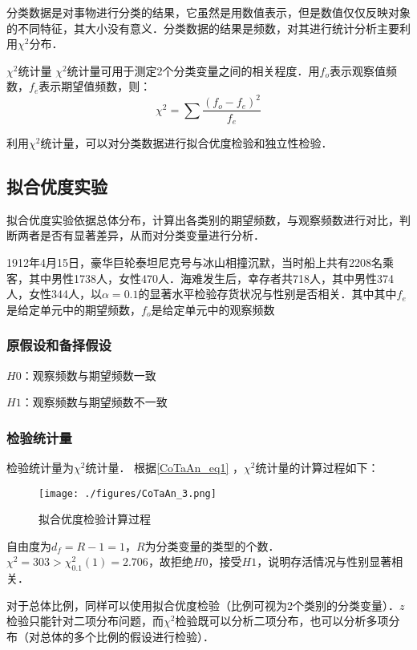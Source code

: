 分类数据是对事物进行分类的结果，它虽然是用数值表示，但是数值仅仅反映对象的不同特征，其大小没有意义．分类数据的结果是频数，对其进行统计分析主要利用$\chi^2$分布．
\begin{definition}{$\chi^2$统计量}
$\chi^2$统计量可用于测定2个分类变量之间的相关程度．用$f_o$表示观察值频数，$f_e$表示期望值频数，则：
\begin{equation}\label{CoTaAn_eq1}
\chi^2 =  \sum \frac {(f_o-f_e)^2}{f_e}
\end{equation}
\end{definition}

利用$\chi^2$统计量，可以对分类数据进行拟合优度检验和独立性检验．
\subsection{拟合优度实验}
拟合优度实验依据总体分布，计算出各类别的期望频数，与观察频数进行对比，判断两者是否有显著差异，从而对分类变量进行分析．
\begin{example}{}
1912年4月15日，豪华巨轮泰坦尼克号与冰山相撞沉默，当时船上共有2208名乘客，其中男性1738人，女性470人．海难发生后，幸存者共718人，其中男性374人，女性344人，以$\alpha=0.1$的显著水平检验存货状况与性别是否相关．其中其中$f_e$是给定单元中的期望频数，$f_o$是给定单元中的观察频数
\subsubsection{原假设和备择假设}
$H0$：观察频数与期望频数一致

$H1$：观察频数与期望频数不一致
\subsubsection{检验统计量}
检验统计量为$\chi^2$统计量．
根据\autoref{CoTaAn_eq1} ，$\chi^2$统计量的计算过程如下：
\begin{figure}[ht]
\centering
\texttt{[image: ./figures/CoTaAn\_3.png]}
\caption{拟合优度检验计算过程} \label{CoTaAn_fig3}
\end{figure}
自由度为$d_f = R-1 = 1$，$R$为分类变量的类型的个数．
$\chi^2 = 303 > \chi^2_0.1(1) = 2.706$，故拒绝$H0$，接受$H1$，说明存活情况与性别显著相关．
\end{example}

对于总体比例，同样可以使用拟合优度检验（比例可视为2个类别的分类变量）．$z$检验只能针对二项分布问题，而$\chi^2$检验既可以分析二项分布，也可以分析多项分布（对总体的多个比例的假设进行检验）．

